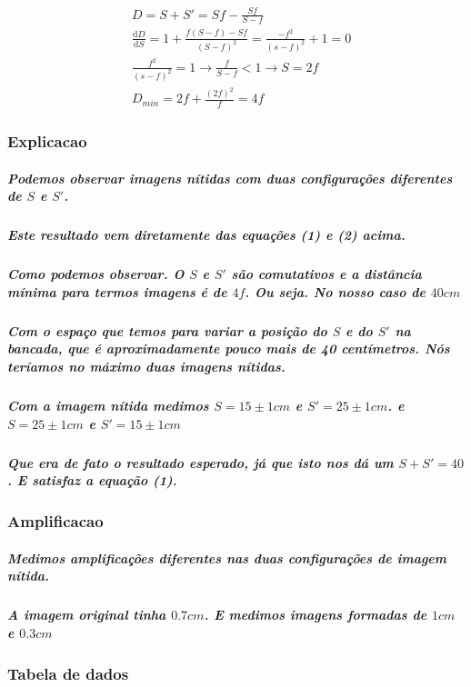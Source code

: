 \documentclass[12pt,twoside, a4paper, twocolumn]{article}
\newcommand\deriv[2]{\frac{\mathrm d #1}{\mathrm d #2}}
\begin{document}
\begin{equation}
  \begin{aligned}
     & D = S + S' = Sf - \frac{Sf}{S - f}                                            \\
     & \deriv{D}{S} = 1 + \frac{f(S-f) - Sf}{(S-f)^2} = \frac{-f^2}{(s-f)^2} + 1 = 0 \\
     & \frac{f^2}{(s-f)^2} = 1 \rightarrow \frac{f}{S-f} < 1 \rightarrow S = 2f      \\
     & D_{min} = 2f + \frac{(2f)^2}{f} = 4f
  \end{aligned}
\end{equation}


\subsubsection{Explicacao}

\subparagraph*{Podemos observar imagens nítidas com duas configurações diferentes de $S$ e $S'$.}

\subparagraph*{Este resultado vem diretamente das equações (1) e (2) acima.}

\subparagraph*{Como podemos observar. O $S$ e $S'$ são comutativos e a distância mínima para termos imagens é de $4f$. Ou seja. No nosso caso de $40cm$}

\subparagraph*{Com o espaço que temos para variar a posição do $S$ e do $S'$ na bancada, que é aproximadamente pouco mais de 40 centímetros. Nós teríamos no máximo duas imagens nítidas.}

\subparagraph*{Com a imagem nítida medimos $S = 15 \pm 1cm$ e $S' = 25 \pm 1cm$. e $S = 25 \pm 1cm$ e $S' = 15 \pm 1cm$}

\subparagraph*{Que era de fato o resultado esperado, já que isto nos dá um $S+S' = 40$. E satisfaz a equação (1).}

\subsubsection{Amplificacao}

\subparagraph*{Medimos amplificações diferentes nas duas configurações de imagem nítida.}

\subparagraph*{A imagem original tinha $0.7cm$. E medimos imagens formadas de $1cm$ e $0.3cm$}



\subsubsection*{Tabela de dados}
\end{document}

